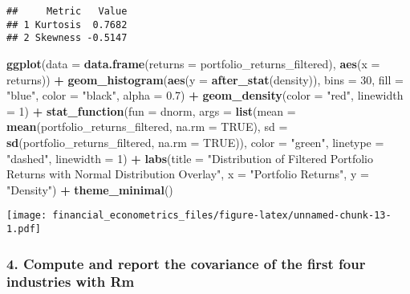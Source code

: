 \documentclass[
]{article}
\newenvironment{Shaded}{\begin{snugshade}}{\end{snugshade}}
\newcommand{\AttributeTok}[1]{\textcolor[rgb]{0.13,0.29,0.53}{#1}}
\newcommand{\ConstantTok}[1]{\textcolor[rgb]{0.56,0.35,0.01}{#1}}
\newcommand{\DecValTok}[1]{\textcolor[rgb]{0.00,0.00,0.81}{#1}}
\newcommand{\FloatTok}[1]{\textcolor[rgb]{0.00,0.00,0.81}{#1}}
\newcommand{\FunctionTok}[1]{\textcolor[rgb]{0.13,0.29,0.53}{\textbf{#1}}}
\newcommand{\NormalTok}[1]{#1}
\newcommand{\SpecialCharTok}[1]{\textcolor[rgb]{0.81,0.36,0.00}{\textbf{#1}}}
\newcommand{\StringTok}[1]{\textcolor[rgb]{0.31,0.60,0.02}{#1}}
\begin{document}
\begin{verbatim}
##     Metric   Value
## 1 Kurtosis  0.7682
## 2 Skewness -0.5147
\end{verbatim}

\begin{Shaded}
\begin{Highlighting}[]
\FunctionTok{ggplot}\NormalTok{(}\AttributeTok{data =} \FunctionTok{data.frame}\NormalTok{(}\AttributeTok{returns =}\NormalTok{ portfolio\_returns\_filtered), }\FunctionTok{aes}\NormalTok{(}\AttributeTok{x =}\NormalTok{ returns)) }\SpecialCharTok{+}
  \FunctionTok{geom\_histogram}\NormalTok{(}\FunctionTok{aes}\NormalTok{(}\AttributeTok{y =} \FunctionTok{after\_stat}\NormalTok{(density)), }\AttributeTok{bins =} \DecValTok{30}\NormalTok{, }\AttributeTok{fill =} \StringTok{"blue"}\NormalTok{, }\AttributeTok{color =} \StringTok{"black"}\NormalTok{, }\AttributeTok{alpha =} \FloatTok{0.7}\NormalTok{) }\SpecialCharTok{+}
  \FunctionTok{geom\_density}\NormalTok{(}\AttributeTok{color =} \StringTok{"red"}\NormalTok{, }\AttributeTok{linewidth =} \DecValTok{1}\NormalTok{) }\SpecialCharTok{+}
  \FunctionTok{stat\_function}\NormalTok{(}\AttributeTok{fun =}\NormalTok{ dnorm, }
                \AttributeTok{args =} \FunctionTok{list}\NormalTok{(}\AttributeTok{mean =} \FunctionTok{mean}\NormalTok{(portfolio\_returns\_filtered, }\AttributeTok{na.rm =} \ConstantTok{TRUE}\NormalTok{), }
                            \AttributeTok{sd =} \FunctionTok{sd}\NormalTok{(portfolio\_returns\_filtered, }\AttributeTok{na.rm =} \ConstantTok{TRUE}\NormalTok{)),}
                \AttributeTok{color =} \StringTok{"green"}\NormalTok{, }\AttributeTok{linetype =} \StringTok{"dashed"}\NormalTok{, }\AttributeTok{linewidth =} \DecValTok{1}\NormalTok{) }\SpecialCharTok{+}
  \FunctionTok{labs}\NormalTok{(}\AttributeTok{title =} \StringTok{"Distribution of Filtered Portfolio Returns with Normal Distribution Overlay"}\NormalTok{,}
       \AttributeTok{x =} \StringTok{"Portfolio Returns"}\NormalTok{,}
       \AttributeTok{y =} \StringTok{"Density"}\NormalTok{) }\SpecialCharTok{+}
  \FunctionTok{theme\_minimal}\NormalTok{()}
\end{Highlighting}
\end{Shaded}

\texttt{[image: financial\_econometrics\_files/figure-latex/unnamed-chunk-13-1.pdf]}

\hypertarget{compute-and-report-the-covariance-of-the-first-four-industries-with-rm}{%
\subsubsection{4. Compute and report the covariance of the first four
industries with
Rm}\label{compute-and-report-the-covariance-of-the-first-four-industries-with-rm}}
\end{document}
